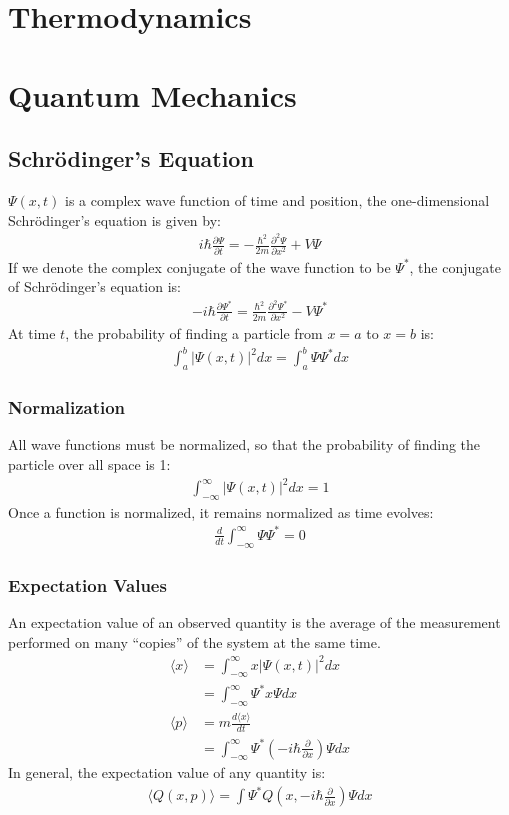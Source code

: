 \documentclass[11pt]{article}
\newcommand{\cc}[1]{
  \ensuremath{#1^{\ast}}}               %
\newcommand{\pd}[2]{
  \ensuremath{
    \frac{\partial #1}{\partial #2} }} %
\begin{document}
\begin{multicols*}{3}
\section{Thermodynamics}

\section{Quantum Mechanics}
\subsection{Schr\"{o}dinger's Equation}
$\Psi(x, t)$ is a complex wave function of time and position, the one-dimensional Schr\"{o}dinger's equation is given by:
\begin{align*}
i \hbar \pd{\Psi}{t} = - \frac{\hbar^2}{2m} \pd{^2 \Psi}{x^2} + V\Psi
\end{align*}
If we denote the complex conjugate of the wave function to be $\cc{\Psi}$, the conjugate of Schr\"{o}dinger's equation is:
\begin{align*}
-i \hbar \pd{\cc{\Psi}}{t} = \frac{\hbar^2}{2m} \pd{^2 \cc{\Psi}}{x^2} - V\cc{\Psi}
\end{align*}
At time $t$, the probability of finding a particle from $x=a$ to $x=b$ is:
\begin{align*}
\int_{a}^{b} |\Psi(x, t)|^2 dx = \int_{a}^{b}\Psi\cc{\Psi}dx
\end{align*}
\subsubsection{Normalization}
All wave functions must be normalized, so that the probability of finding the particle over all space is 1:
\begin{align*}
\int_{-\infty}^{\infty} |\Psi(x,t)|^2 dx = 1
\end{align*}
Once a function is normalized, it remains normalized as time evolves:
\begin{align*}
\frac{d}{dt} \int_{-\infty}^{\infty} \Psi \cc{\Psi} = 0
\end{align*}
\subsubsection{Expectation Values}
An expectation value of an observed quantity is the average of the measurement performed on many ``copies'' of the system at the same time.
\begin{align*}
\langle x\rangle &= \int_{-\infty}^{\infty} x |\Psi(x,t)|^2 dx \\
&= \int_{-\infty}^{\infty} \cc{\Psi} x \Psi dx \\
\langle p\rangle &= m\frac{d\langle x\rangle}{dt} \\
&= \int_{-\infty}^{\infty} \cc{\Psi} \left( -i\hbar \pd{}{x} \right) \Psi dx
\end{align*}
In general, the expectation value of any quantity is:
\begin{align*}
\langle Q(x, p) \rangle = \int \cc{\Psi} Q\left(x, -i\hbar\pd{}{x} \right) \Psi dx
\end{align*}


\end{multicols*}
\end{document}
